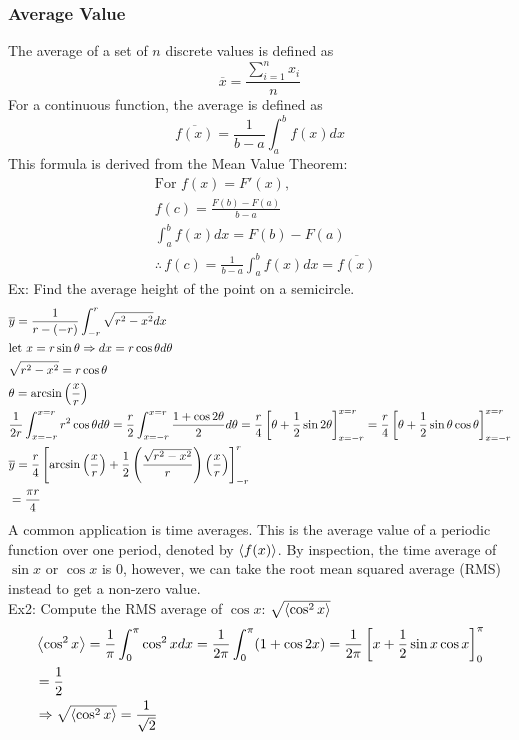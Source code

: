 \documentclass[11pt, fleqn]{article}
\begin{document}
\subsubsection{Average Value}
The average of a set of $n$ discrete values is defined as
$$\overline{x}=\frac{\sum\limits_{i=1}^nx_i}{n}$$
For a continuous function, the average is defined as
$$\overline{f(x)}=\frac{1}{b-a}\int_a^bf(x)dx$$
This formula is derived from the Mean Value Theorem:
\begin{align*}
    &\text{For }f(x)=F'(x),\\
    &f(c)=\frac{F(b)-F(a)}{b-a}\\
    &\int_a^bf(x)dx=F(b)-F(a)\\
    &\therefore\,f(c)=\frac{1}{b-a}\int_a^bf(x)dx=\overline{f(x)}
\end{align*}
Ex: Find the average height of the point on a semicircle.
\begin{align*}
    &\overline{y}=\frac{1}{r-(-r)}\int_{-r}^r\sqrt{r^2-x^2}dx\\
    &\text{let }x=r\sin\theta\Rightarrow dx=r\cos\theta d\theta\\
    &\sqrt{r^2-x^2}=r\cos\theta\\
    &\theta=\arcsin\left( \frac{x}{r} \right)\\
    &\frac{1}{2r}\int_{x=-r}^{x=r}r^2\cos\theta d\theta=\frac{r}{2}\int_{x=-r}^{x=r}\frac{1+\cos2\theta}{2}d\theta=\frac{r}{4}\left[ \theta+\frac{1}{2}\sin2\theta \right]_{x=-r}^{x=r}=\frac{r}{4}\left[ \theta+\frac{1}{2}\sin\theta\cos\theta \right]_{x=-r}^{x=r}\\
    &\overline{y}=\frac{r}{4}\left[ \arcsin\left( \frac{x}{r} \right)+\frac{1}{2}\left( \frac{\sqrt{r^2-x^2}}{r} \right)\left( \frac{x}{r} \right) \right]_{-r}^r\\
    &=\frac{\pi r}{4}
\end{align*}
A common application is time averages. This is the average value of a periodic function over one period, denoted by $\left\langle f(x) \right\rangle$. By inspection, the time average of $\sin x$ or $\cos x$ is 0, however, we can take the root mean squared average (RMS) instead to get a non-zero value.\\
Ex2: Compute the RMS average of $\cos x$: $\sqrt{\left\langle \cos^2x \right\rangle}$
\begin{align*}
    &\left\langle \cos^2x \right\rangle=\frac{1}{\pi}\int_0^\pi\cos^2xdx=\frac{1}{2\pi}\int_0^\pi(1+\cos2x)=\frac{1}{2\pi}\left[ x+\frac{1}{2}\sin x\cos x \right]_0^\pi\\
    &=\frac{1}{2}\\
    &\Rightarrow\sqrt{\left\langle \cos^2x \right\rangle}=\frac{1}{\sqrt{2}}
\end{align*}
\end{document}
